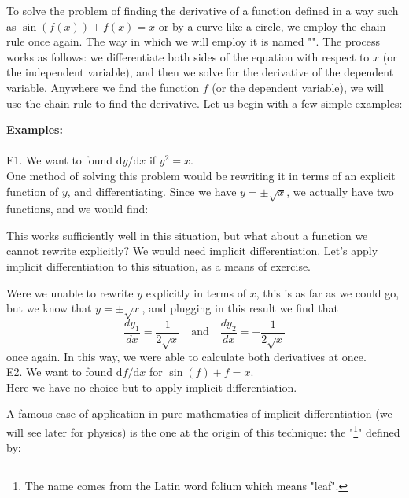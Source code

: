 	To solve the problem of finding the derivative of a function defined in a way such as $\sin(f(x)) + f(x) = x$ or by a curve like a circle, we employ the chain rule once again. The way in which we will employ it is named "". The process works as follows: we differentiate both sides of the equation with respect to $x$ (or the independent variable), and then we solve for the derivative of the dependent variable. Anywhere we find the function $f$ (or the dependent variable), we will use the chain rule to find the derivative. Let us begin with a few simple examples:
	\begin{tcolorbox}[colframe=black,colback=white,sharp corners]
	\textbf{{\Large {}}Examples:}\\\\
	E1. We want to found $\mathrm{d}y/\mathrm{d}x$ if $y^2 = x$.\\
	
	One method of solving this problem would be rewriting it in terms of an explicit function of $y$, and differentiating. Since we have $y = \pm \sqrt{x}$, we actually have two functions, and we would find:
	
	This works sufficiently well in this situation, but what about a function we cannot rewrite explicitly? We would need implicit differentiation. Let's apply implicit differentiation to this situation, as a means of exercise. 
	
	Were we unable to rewrite $y$ explicitly in terms of $x$, this is as far as we could go, but we know that $y = \pm \sqrt{x}$, and plugging in this result we find that 
	$$\frac{dy_1}{dx} = \frac{1}{2\sqrt{x}} \quad \text{and} \quad \frac{dy_2}{dx} = -\frac{1}{2\sqrt{x}}$$
	once again. In this way, we were able to calculate both derivatives at once.\\
	
	E2. We want to found $\mathrm{d}f/\mathrm{d}x$ for $\sin(f) + f = x$.\\
	
	Here we have no choice but to apply implicit differentiation. 
	
	\end{tcolorbox}
	A famous case of application in pure mathematics of implicit differentiation (we will see later for physics) is the one at the origin of this technique: the "\footnote{The name comes from the Latin word folium which means "leaf".}" defined by:
	
